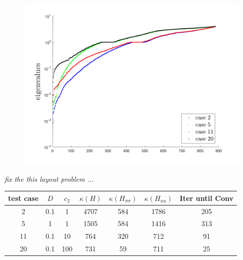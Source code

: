 \documentclass[../draft_1.tex]{subfiles}
\begin{document}
	\begin{figure}	\includegraphics[scale=0.4]{images/implementation/eigenvalues/some_eigenvalues_logy}
	\caption{}
	\end{figure}
\textit{fix the this layout problem ...}


\begin{table}
	\centering
	\begin{tabular}{|c|c|c|c|c|c|c|}
		\hline
		test case & $D$ & $c_2$& $\kappa(H)$ & $\kappa(H_{\sigma \sigma})$ & $\kappa(H_{u u})$ & Iter until Conv \\ \hline
		\toprule
		2& 0.1&1& 4707& 584 &  1786& 205 \\ \hline
		5& 1&1& 1505 & 584 & 1416 & 313 \\ \hline
		11& 0.1&10&764 & 320 & 712 & 91 \\ \hline
		20& 0.1&100&731 & 59 &  711& 25 \\ \hline
	\end{tabular}
\end{table}
\end{document}
